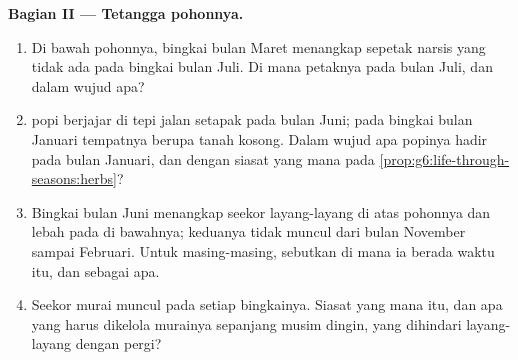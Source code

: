 \begin{problem}
\medskip\noindent\textbf{Bagian II --- Tetangga pohonnya.}
\begin{enumerate}[resume]
  \item Di bawah pohonnya, bingkai bulan Maret menangkap sepetak 
        narsis yang tidak ada pada bingkai bulan Juli. Di mana
        petaknya pada bulan Juli, dan dalam wujud apa?
  \item {} popi berjajar di tepi jalan setapak pada bulan Juni; pada
        bingkai bulan Januari tempatnya berupa tanah kosong. Dalam
        wujud apa  popinya hadir pada bulan Januari, dan dengan
        siasat yang mana pada
        \cref{prop:g6:life-through-seasons:herbs}?
  \item Bingkai bulan Juni menangkap seekor  layang-layang di
        atas pohonnya dan lebah pada  di bawahnya; keduanya tidak
        muncul dari bulan November sampai Februari. Untuk
        masing-masing, sebutkan di mana ia berada waktu itu, dan
        sebagai apa.
  \item Seekor  murai muncul pada setiap bingkainya. Siasat 
        yang mana itu, dan apa yang harus dikelola  murainya sepanjang
        musim dingin, yang dihindari  layang-layang dengan pergi?
\end{enumerate}


\end{problem}
